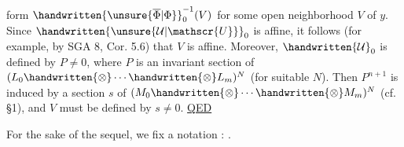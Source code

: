 form $\handwritten{\unsure{\overline{\Phi}|\Phi}}_0^{-1}(V)$ for some open neighborhood $V$ of $y$. Since $\handwritten{\unsure{\mathcal{U}|\mathscr{U}}}_0$ is
affine, it follows (for example, by SGA 8, Cor. 5.6) that $V$ is
affine. Moreover, $\handwritten{\mathcal{U}}_0$ is defined by $P\ne 0$, where $P$ is an invariant section of $(L_0\handwritten{\otimes}\cdots\handwritten{\otimes}L_m)^N$ (for suitable $N$). Then $P^{n+1}$
is induced by a section $s$ of $(M_0\handwritten{\otimes}\cdots\handwritten{\otimes}M_m)^N$ (cf. \S1), and $V$
must be defined by $s\ne 0$. \quad\uline{QED}

For the sake of the sequel, we fix a  notation :
.

